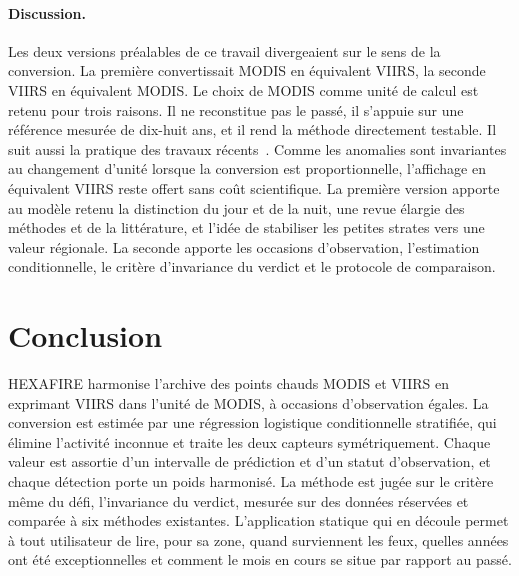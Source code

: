 \documentclass[11pt,a4paper]{article}
\begin{document}
\paragraph{Discussion.} Les deux versions préalables de ce travail divergeaient sur le sens de la conversion. La première convertissait MODIS en équivalent VIIRS, la seconde VIIRS en équivalent MODIS. Le choix de MODIS comme unité de calcul est retenu pour trois raisons. Il ne reconstitue pas le passé, il s'appuie sur une référence mesurée de dix-huit ans, et il rend la méthode directement testable. Il suit aussi la pratique des travaux récents~\cite{chen2026,li2020,seguini2026}. Comme les anomalies sont invariantes au changement d'unité lorsque la conversion est proportionnelle, l'affichage en équivalent VIIRS reste offert sans coût scientifique. La première version apporte au modèle retenu la distinction du jour et de la nuit, une revue élargie des méthodes et de la littérature, et l'idée de stabiliser les petites strates vers une valeur régionale. La seconde apporte les occasions d'observation, l'estimation conditionnelle, le critère d'invariance du verdict et le protocole de comparaison.

\section{Conclusion}

HEXAFIRE harmonise l'archive des points chauds MODIS et VIIRS en exprimant VIIRS dans l'unité de MODIS, à occasions d'observation égales. La conversion est estimée par une régression logistique conditionnelle stratifiée, qui élimine l'activité inconnue et traite les deux capteurs symétriquement. Chaque valeur est assortie d'un intervalle de prédiction et d'un statut d'observation, et chaque détection porte un poids harmonisé. La méthode est jugée sur le critère même du défi, l'invariance du verdict, mesurée sur des données réservées et comparée à six méthodes existantes. L'application statique qui en découle permet à tout utilisateur de lire, pour sa zone, quand surviennent les feux, quelles années ont été exceptionnelles et comment le mois en cours se situe par rapport au passé.
\end{document}
